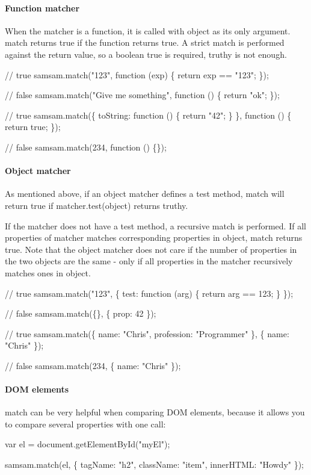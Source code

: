 \paragraph*{Function matcher}

When the matcher is a function, it is called with {\ttfamily object} as its only argument. {\ttfamily match} returns {\ttfamily true} if the function returns {\ttfamily true}. A strict match is performed against the return value, so a boolean {\ttfamily true} is required, truthy is not enough.


\begin{DoxyCode}
// true
samsam.match("123", function (exp) \{
    return exp == "123";
\});

// false
samsam.match("Give me something", function () \{
    return "ok";
\});

// true
samsam.match(\{
    toString: function () \{
        return "42";
    \}
\}, function () \{ return true; \});

// false
samsam.match(234, function () \{\});
\end{DoxyCode}


\paragraph*{Object matcher}

As mentioned above, if an object matcher defines a {\ttfamily test} method, {\ttfamily match} will return {\ttfamily true} if {\ttfamily matcher.\+test(object)} returns truthy.

If the matcher does not have a test method, a recursive match is performed. If all properties of {\ttfamily matcher} matches corresponding properties in {\ttfamily object}, {\ttfamily match} returns {\ttfamily true}. Note that the object matcher does not care if the number of properties in the two objects are the same -\/ only if all properties in the matcher recursively matches ones in {\ttfamily object}.


\begin{DoxyCode}
// true
samsam.match("123", \{
    test: function (arg) \{
        return arg == 123;
    \}
\});

// false
samsam.match(\{\}, \{ prop: 42 \});

// true
samsam.match(\{
    name: "Chris",
    profession: "Programmer"
\}, \{
    name: "Chris"
\});

// false
samsam.match(234, \{ name: "Chris" \});
\end{DoxyCode}


\paragraph*{D\+OM elements}

{\ttfamily match} can be very helpful when comparing D\+OM elements, because it allows you to compare several properties with one call\+:


\begin{DoxyCode}
var el = document.getElementById("myEl");

samsam.match(el, \{
    tagName: "h2",
    className: "item",
    innerHTML: "Howdy"
\});
\end{DoxyCode}
 